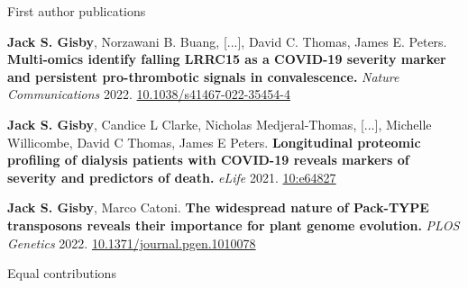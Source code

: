 \documentclass{resume}
\begin{document}
\begin{rSection}{First author publications}

\vspace{1pt plus 1pt}

\item \textbf{Jack S. Gisby}\textsuperscript{\textdagger}, Norzawani B. Buang\textsuperscript{\textdagger}, [...], David C. Thomas\textsuperscript{\textdagger}, James E. Peters\textsuperscript{\textdagger}. \textbf{Multi-omics identify falling LRRC15 as a COVID-19 severity marker and persistent pro-thrombotic signals in convalescence.} \textit{Nature Communications} 2022. \href{https://doi.org/10.1038/s41467-022-35454-4}{10.1038/s41467-022-35454-4}

\vspace{4pt plus 1pt}

\item \textbf{Jack S. Gisby}\textsuperscript{\textdagger}, Candice L Clarke\textsuperscript{\textdagger}, Nicholas Medjeral-Thomas\textsuperscript{\textdagger}, [...], Michelle Willicombe\textsuperscript{\textdagger}, David C Thomas\textsuperscript{\textdagger}, James E Peters\textsuperscript{\textdagger}. \textbf{Longitudinal proteomic profiling of dialysis patients with COVID-19 reveals markers of severity and predictors of death.} \textit{eLife} 2021. \href{https://doi.org/10.7554/eLife.64827}{10:e64827}
\vspace{4pt plus 1pt}

\item \textbf{Jack S. Gisby}, Marco Catoni. \textbf{The widespread nature of Pack-TYPE transposons reveals their importance for plant genome evolution.} \textit{PLOS Genetics} 2022. \href{https://doi.org/10.1371/journal.pgen.1010078}{10.1371/journal.pgen.1010078}

\textdagger Equal contributions \hfill {}

\end{rSection}
\end{document}
